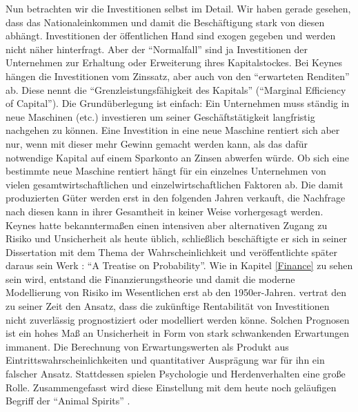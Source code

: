Nun betrachten wir die Investitionen selbst im Detail. Wir haben gerade gesehen, dass das Nationaleinkommen und damit die Beschäftigung stark von diesen abhängt. Investitionen der öffentlichen Hand sind exogen gegeben und werden nicht näher hinterfragt. Aber der "`Normalfall"' sind ja Investitionen der Unternehmen zur Erhaltung oder Erweiterung ihres Kapitalstockes. Bei Keynes hängen die Investitionen vom Zinssatz, aber auch von den "`erwarteten Renditen"' ab. Diese nennt \textcite[S. 135]{Keynes1936} die "`Grenzleistungsfähigkeit des Kapitals"' ("`Marginal Efficiency of Capital"'). Die Grundüberlegung ist einfach: Ein Unternehmen muss ständig in neue Maschinen (etc.) investieren um seiner Geschäftstätigkeit langfristig nachgehen zu können. Eine Investition in eine neue Maschine rentiert sich aber nur, wenn mit dieser mehr Gewinn gemacht werden kann, als das dafür notwendige Kapital auf einem Sparkonto an Zinsen abwerfen würde. Ob sich eine bestimmte neue Maschine rentiert hängt für ein einzelnes Unternehmen von vielen gesamtwirtschaftlichen und einzelwirtschaftlichen Faktoren ab. Die damit produzierten Güter werden erst in den folgenden Jahren verkauft, die Nachfrage nach diesen kann in ihrer Gesamtheit in keiner Weise vorhergesagt werden. Keynes hatte bekanntermaßen einen intensiven aber alternativen Zugang zu Risiko und Unsicherheit als heute üblich, schließlich beschäftigte er sich in seiner Dissertation mit dem Thema der Wahrscheinlichkeit und veröffentlichte später daraus sein Werk \textcite{Keynes1921}: "`A Treatise on Probability"'. Wie in Kapitel \ref{Finance} zu sehen sein wird, entstand die Finanzierungstheorie und damit die moderne Modellierung von Risiko im Wesentlichen erst ab den 1950er-Jahren. \textcite{Keynes1936} vertrat den zu seiner Zeit den Ansatz, dass die zukünftige Rentabilität von Investitionen nicht zuverlässig prognostiziert oder modelliert werden könne. Solchen Prognosen ist ein hohes Maß an Unsicherheit in Form von stark schwankenden Erwartungen immanent. Die Berechnung von Erwartungswerten als Produkt aus Eintrittswahrscheinlichkeiten und quantitativer Ausprägung war für ihn ein falscher Ansatz. Stattdessen spielen Psychologie und Herdenverhalten eine große Rolle. Zusammengefasst wird diese Einstellung mit dem heute noch geläufigen Begriff der "`Animal Spirits"' \parencite[S. 161f]{Keynes1936}. 

